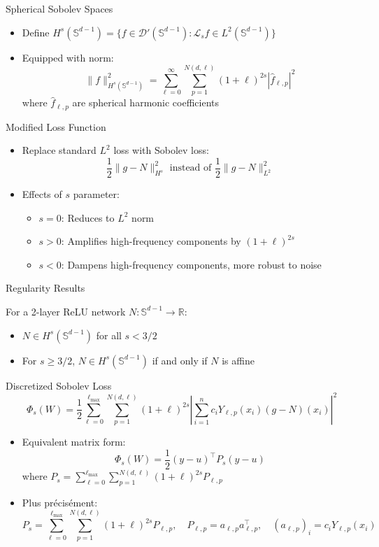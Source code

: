 \documentclass{beamer}
\newcommand{\R}{\mathbb{R}}
\newcommand{\Sd}{\mathbb{S}^{d-1}}
\newcommand{\Ls}{\mathcal{L}_s}
\begin{document}
\begin{frame}{Spherical Sobolev Spaces}
\begin{itemize}
\item Define $H^s(\Sd) = \{f \in \mathcal{D}'(\Sd) : \Ls f \in L^2(\Sd)\}$
\item Equipped with norm:
\[ \|f\|^2_{H^s(\Sd)} = \sum_{\ell=0}^{\infty} \sum_{p=1}^{N(d,\ell)} (1+\ell)^{2s} |\hat{f}_{\ell,p}|^2 \]
where $\hat{f}_{\ell,p}$ are spherical harmonic coefficients
\end{itemize}
\end{frame}

\begin{frame}{Modified Loss Function}
\begin{itemize}
\item Replace standard $L^2$ loss with Sobolev loss:
\[ \frac{1}{2}\|g-N\|^2_{H^s} \text{ instead of } \frac{1}{2}\|g-N\|^2_{L^2} \]
\item Effects of $s$ parameter:
\begin{itemize}
\item $s = 0$: Reduces to $L^2$ norm
\item $s > 0$: Amplifies high-frequency components by $(1+\ell)^{2s}$
\item $s < 0$: Dampens high-frequency components, more robust to noise
\end{itemize}
\end{itemize}
\end{frame}

\begin{frame}{Regularity Results}
\begin{theorem}
For a 2-layer ReLU network $N: \Sd \to \R$:
\begin{itemize}
\item $N \in H^s(\Sd)$ for all $s < 3/2$
\item For $s \geq 3/2$, $N \in H^s(\Sd)$ if and only if $N$ is affine
\end{itemize}
\end{theorem}
\end{frame}

\begin{frame}{Discretized Sobolev Loss}
\begin{equation*}
\Phi_s(W) = \frac{1}{2} \sum_{\ell=0}^{\ell_{\max}} \sum_{p=1}^{N(d,\ell)} (1+\ell)^{2s} \left|\sum_{i=1}^n c_i Y_{\ell,p}(x_i)(g-N)(x_i)\right|^2
\end{equation*}
\begin{itemize}
\item Equivalent matrix form:
\[ \Phi_s(W) = \frac{1}{2}(y-u)^\top P_s(y-u) \]
where $P_s = \sum_{\ell=0}^{\ell_{\max}} \sum_{p=1}^{N(d,\ell)} (1+\ell)^{2s}P_{\ell,p}$
\item Plus précisément:
\[ P_s = \sum_{\ell=0}^{\ell_{\max}} \sum_{p=1}^{N(d,\ell)} (1+\ell)^{2s}P_{\ell,p}, \quad P_{\ell,p} = a_{\ell,p}a_{\ell,p}^\top, \quad (a_{\ell,p})_i = c_iY_{\ell,p}(x_i) \]
\end{itemize}
\end{frame}
\end{document}
